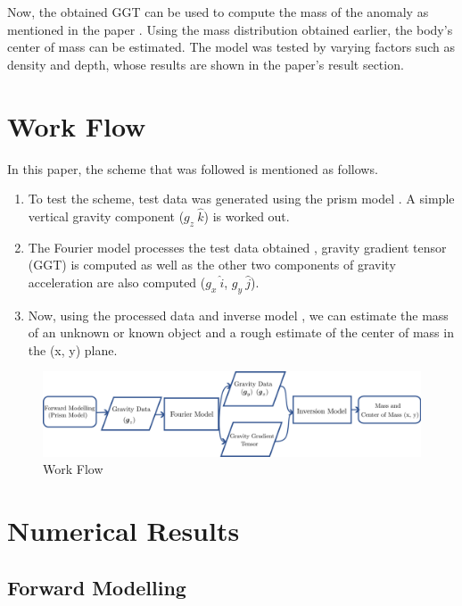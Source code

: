 \documentclass[a4paper,11pt]{article}
\begin{document}
\noindent Now, the obtained GGT can be used to compute the mass of the anomaly as mentioned in the paper \cite{tang2017analytical}. Using the mass distribution obtained earlier, the body's center of mass can be estimated. The model was tested by varying factors such as density and depth, whose results are shown in the paper's result section. 

\section{Work Flow}
In this paper, the scheme that was followed is mentioned as follows.

\begin{enumerate}
    \item To test the scheme, test data was generated using the prism model \cite{plouff1975derivation} \cite{plouff1976gravity}. A simple vertical gravity component ($g_z\ \hat{k}$) is worked out.
    \item The Fourier model processes the test data obtained \cite{mickus2001complete}, gravity gradient tensor (GGT) is computed as well as the other two components of gravity acceleration are also computed ($g_x\ \hat{i}$, $g_y\ \hat{j}$).         

    \item Now, using the processed data and inverse model \cite{tang2017analytical}, we can estimate the mass of an unknown or known object and a rough estimate of the center of mass in the (x, y) plane.
    
\end{enumerate}

\begin{figure}
    \centering
    \includegraphics[scale=2.25]{images/flow.png}
    \caption{Work Flow}
\end{figure}

\section{Numerical Results}

\subsection{Forward Modelling}
\end{document}
